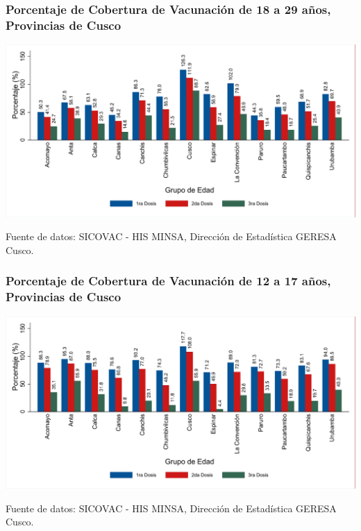 \documentclass[xcolor=table]{beamer}
\begin{document}
\begin{frame}[label=vacunas_30]
	\frametitle{Porcentaje de Cobertura de Vacunación de 18 a 29 años, Provincias de Cusco}
	\vspace{-.5cm}
	\begin{center}
		\includegraphics[width=1.0\linewidth, trim={.2cm .5cm .2cm .2cm},clip]{../figuras/vacunacion_provincial_edad_practica_3.pdf}
	\end{center}
	{\tiny Fuente de datos: SICOVAC - HIS MINSA, Dirección de Estadística GERESA Cusco. \\}
\hyperlink{cobertura_vacuna_provincias}{}
\end{frame}

\begin{frame}[label=vacunas_20]
	\frametitle{Porcentaje de Cobertura de Vacunación de 12 a 17 años, Provincias de Cusco}
	\vspace{-.5cm}
	\begin{center}
		\includegraphics[width=1.0\linewidth, trim={.2cm .5cm .2cm .2cm},clip]{../figuras/vacunacion_provincial_edad_practica_2.pdf}
	\end{center}
	{\tiny Fuente de datos: SICOVAC - HIS MINSA, Dirección de Estadística GERESA Cusco. \\}
\hyperlink{cobertura_vacuna_provincias}{}

\end{frame}
\end{document}
